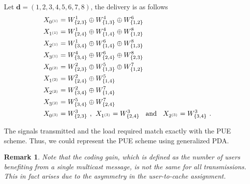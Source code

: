 \documentclass[conference,a4paper,10pt]{IEEEtran}
\newtheorem{rem}{Remark}
\begin{document}
\noindent Let $\mathbf{d}=(1,2,3,4,5,6,7,8)$, the delivery is as follows
\begin{equation*}
\begin{aligned}
X_{0^{(1)}} & = W^1_{\{2,3\}} \oplus W^4_{\{1,3\}} \oplus W^6_{\{1,2\}} \\
X_{1^{(1)}} & = W^1_{\{2,4\}} \oplus W^4_{\{1,4\}} \oplus W^8_{\{1,2\}} \\
X_{2^{(1)}} & = W^1_{\{3,4\}} \oplus W^6_{\{1,4\}} \oplus W^8_{\{1,3\}} \\
X_{3^{(1)}} & = W^4_{\{3,4\}} \oplus W^6_{\{2,4\}} \oplus W^8_{\{2,3\}} \\
X_{0^{(2)}} & = W^2_{\{2,3\}} \oplus W^5_{\{1,3\}} \oplus W^7_{\{1,2\}} \\
X_{1^{(2)}} & = W^2_{\{2,4\}} \oplus W^5_{\{1,4\}} \\
X_{2^{(2)}} & = W^2_{\{3,4\}} \oplus W^7_{\{1,4\}} \\
X_{3^{(2)}} & = W^5_{\{3,4\}} \oplus W^7_{\{2,4\}} \\
X_{0^{(3)}} & = W^3_{\{2,3\}}  \textrm{ \hspace{0.01cm},\hspace{0.2cm}}
X_{1^{(3)}}  = W^3_{\{2,4\}} \textrm{ \hspace{0.2cm}and \hspace{0.2cm}} 
X_{2^{(3)}}  = W^3_{\{3,4\}} \textrm{ \hspace{0.01cm}}. 
\end{aligned}
\end{equation*}

The signals transmitted and the load required match exactly with the PUE scheme. Thus, we could represent the PUE scheme using generalized PDA. 



\begin{rem}
Note that the coding gain, which is defined as the number of users benefiting from a single multicast message, is not the same for all transmissions. This in fact arises due to the asymmetry in the user-to-cache assignment.
\end{rem}
\end{document}
